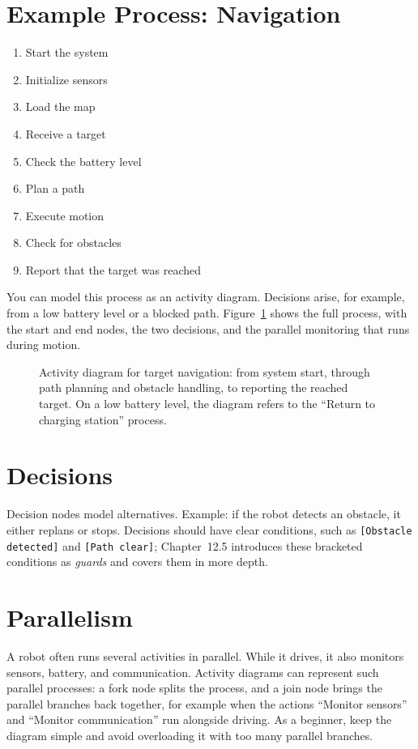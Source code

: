 \section{Example Process: Navigation}
\begin{enumerate}
    \item Start the system
    \item Initialize sensors
    \item Load the map
    \item Receive a target
    \item Check the battery level
    \item Plan a path
    \item Execute motion
    \item Check for obstacles
    \item Report that the target was reached
\end{enumerate}

You can model this process as an activity diagram. Decisions arise, for example, from a low battery level or a blocked path. Figure~\ref{fig:kap11-aktivitaet-zielnavigation} shows the full process, with the start and end nodes, the two decisions, and the parallel monitoring that runs during motion.

\begin{figure}[H]
  \centering
  
  \caption{Activity diagram for target navigation: from system start, through path planning and obstacle handling, to reporting the reached target. On a low battery level, the diagram refers to the \enquote{Return to charging station} process.}
  \label{fig:kap11-aktivitaet-zielnavigation}
\end{figure}

\section{Decisions}
Decision nodes model alternatives. Example: if the robot detects an obstacle, it either replans or stops. Decisions should have clear conditions, such as \texttt{[Obstacle detected]} and \texttt{[Path clear]}; Chapter~12.5 introduces these bracketed conditions as \emph{guards} and covers them in more depth.

\section{Parallelism}
A robot often runs several activities in parallel. While it drives, it also monitors sensors, battery, and communication. Activity diagrams can represent such parallel processes: a fork node splits the process, and a join node brings the parallel branches back together, for example when the actions \enquote{Monitor sensors} and \enquote{Monitor communication} run alongside driving. As a beginner, keep the diagram simple and avoid overloading it with too many parallel branches.

